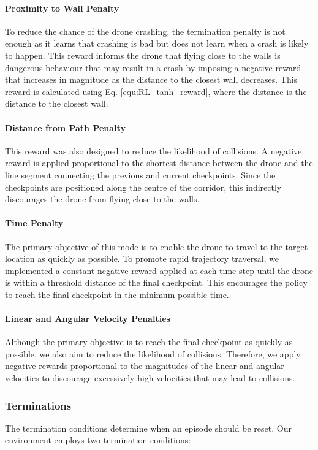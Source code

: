\documentclass{report_template_oxford}
\begin{document}
\paragraph{Proximity to Wall Penalty} To reduce the chance of the drone crashing, the termination penalty is not enough as it learns that crashing is bad but does not learn when a crash is likely to happen. This reward informs the drone that flying close to the walls is dangerous behaviour that may result in a crash by imposing a negative reward that increases in magnitude as the distance to the closest wall decreases. This reward is calculated using Eq. \ref{equ:RL_tanh_reward}, where the distance is the distance to the closest wall.

\paragraph{Distance from Path Penalty} This reward was also designed to reduce the likelihood of collisions. A negative reward is applied proportional to the shortest distance between the drone and the line segment connecting the previous and current checkpoints. Since the checkpoints are positioned along the centre of the corridor, this indirectly discourages the drone from flying close to the walls.

\paragraph{Time Penalty} The primary objective of this mode is to enable the drone to travel to the target location as quickly as possible. To promote rapid trajectory traversal, we implemented a constant negative reward applied at each time step until the drone is within a threshold distance of the final checkpoint. This encourages the policy to reach the final checkpoint in the minimum possible time.

\paragraph{Linear and Angular Velocity Penalties} Although the primary objective is to reach the final checkpoint as quickly as possible, we also aim to reduce the likelihood of collisions. Therefore, we apply negative rewards proportional to the magnitudes of the linear and angular velocities to discourage excessively high velocities that may lead to collisions.

\subsubsection{Terminations} \label{RLTerminations}
The termination conditions determine when an episode should be reset. Our environment employs two termination conditions:
\end{document}
